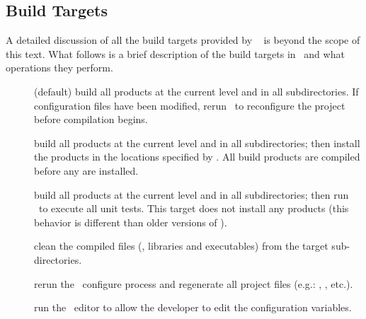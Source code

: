 \subsection{Build Targets}

A detailed discussion of all the build targets provided by \cmake~\cite{cmake} is beyond the scope of this text. 
What follows is a brief description of the build targets in \draco\ and what operations they perform.
\begin{description}
\item[] (default) build all products at the current level and in all subdirectories.  If configuration files have been modified, rerun \cmake\ to reconfigure the project before compilation begins.
\item[] build all products at the current level and in all subdirectories; then install the products in the locations specified by .  All build products are compiled before any are installed. 
\item[] build all products at the current level and in all subdirectories; then run \ctest\ to execute all unit tests.  This target does not install any products (this behavior is different than older versions of \draco).
\item[] clean the compiled files (, libraries and executables) from the target sub-directories.
\item[] rerun the \cmake\ configure process and regenerate all project files (e.g.: , , etc.).
\item[] run the \cmake\ editor to allow the developer to edit the configuration variables. 

\end{description}
